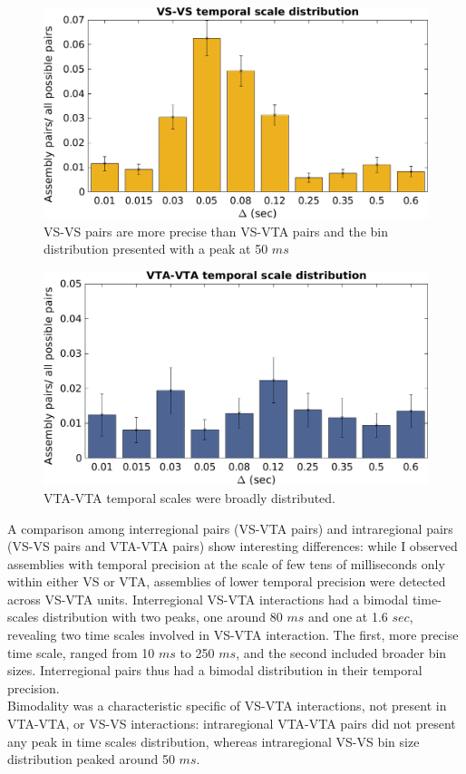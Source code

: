 \begin{figure}[H]
\centering
\includegraphics[scale=0.44]{figures/VS_VS_S.png}
\caption{VS-VS pairs are more precise than VS-VTA pairs and the bin distribution presented with a peak at 50 $ms$}
\label{fig:BinDistrVS}
\end{figure}
\begin{figure}[H]
\centering
\includegraphics[scale=0.44]{figures/VTA_VTA_S.png}
\caption{VTA-VTA temporal scales were broadly distributed.}
\label{fig:BinDistrVTA}
\end{figure}
A comparison among interregional pairs (VS-VTA pairs) and intraregional pairs (VS-VS pairs and VTA-VTA pairs) show interesting differences: while I observed assemblies with temporal precision at the scale of few tens of milliseconds only within either VS or VTA, assemblies of lower temporal precision were detected across VS-VTA units. Interregional VS-VTA interactions had a bimodal time-scales distribution with two peaks, one around 80 $ms$ and one at 1.6 $sec$, revealing two time scales involved in VS-VTA interaction. The first, more precise time scale, ranged from 10 $ms$ to 250 $ms$, and the second included broader bin sizes. Interregional pairs thus had a bimodal distribution in their temporal precision.\\Bimodality was a characteristic specific of VS-VTA interactions, not present in VTA-VTA, or VS-VS interactions: intraregional VTA-VTA pairs did not present any peak in time scales distribution, whereas intraregional VS-VS bin size distribution peaked around 50 $ms$.  
